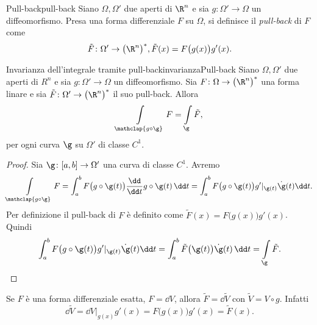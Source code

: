 \begin{defn}{Pull-back}{pull-back}
	Siano \(\Omega,\Omega'\) due aperti di \(\R^n\) e sia \(g\colon \Omega' \to \Omega\) un diffeomorfismo.
	Presa una forma differenziale \(F\) su \(\Omega\), si definisce il \emph{pull-back} di \(F\) come
	\[
		\tilde{F}\colon \Omega' \to \big(\R^n\big)^*, \tilde{F}(x) = F\big(g(x)\big)g'(x).
	\]
\end{defn}

\begin{teor}{Invarianza dell'integrale tramite pull-back}{invarianzaPull-back}
	Siano \(\Omega,\Omega'\) due aperti di \(R^n\) e sia \(g\colon \Omega'\to \Omega\) un diffeomorfismo.
	Sia \(F\colon \Omega\to \big(\R^n\big)^*\) una forma linare e sia \(\tilde{F}\colon \Omega' \to \big(\R^n\big)^*\) il suo pull-back.
	Allora
	\[
		\int\limits_{\mathclap{g\circ \g}} F = \int\limits_\g \tilde{F},
	\]
	per ogni curva \(\g\) su \(\Omega'\) di classe \(C^1\).
\end{teor}

\begin{proof}
	Sia \(\g\colon [a,b] \to \Omega'\) una curva di classe \(C^1\).
	Avremo
	\[
		\int\limits_{\mathclap{g\circ \g}} F = \int_a^b F\big(g\circ \g(t)\big) \frac{\dd}{\dd t}g\circ \g(t)\,\dd t = \int_a^b F\big(g\circ \g(t)\big) g'|_{\g(t)} \dot{\g}(t)\dd t.
	\]
	Per definizione il pull-back di \(F\) è definito come \(\tilde{F}(x) = F\big(g(x)\big)g'(x)\).
	Quindi
	\[
		\int_a^b F\big(g\circ \g(t)\big) g'|_{\g(t)} \dot{\g}(t)\dd t = \int_a^b \tilde{F}\big(\g(t)\big)\dot{\g}(t)\,\dd t = \int\limits_\g \tilde{F}.\qedhere
	\]
\end{proof}

\begin{oss}
	Se \(F\) è una forma differenziale esatta, \(F=\dd V\), allora \(\tilde{F}=\dd \tilde{V}\) con \(\tilde{V} = V\circ g\).
	Infatti
	\[
		\dd\tilde{V} = \dd V|_{g(x)} g'(x) = F\big(g(x)\big)g'(x) = \tilde{F}(x).
	\]
\end{oss}

